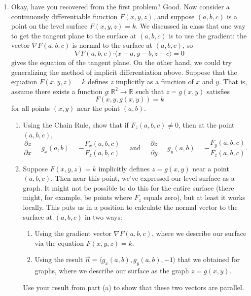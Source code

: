 \documentclass[letterpaper,12pt]{article}
\newcommand{\R}{\mathbb{R}}
\newcommand{\dotp}{\boldsymbol{\cdot}}
\begin{document}
\begin{enumerate}
\item Okay, have you recovered from the first problem? Good. Now consider a continuously differentiable function $F(x,y,z)$, and suppose $(a,b,c)$ is a point on the level surface $F(x,y,z)=k$. We discussed in class that one way to get the tangent plane to the surface at $(a,b,c)$ is to use the gradient: the vector $\nabla F(a,b,c)$ is normal to the surface at $(a,b,c)$, so
\[
 \nabla F(a,b,c) \dotp \langle x-a, y-b, z-c\rangle = 0
\]
gives the equation of the tangent plane. On the other hand, we could try generalizing the method of implicit differentiation above. Suppose that the equation $F(x,y,z)=k$ defines $z$ implicitly as a function of $x$ and $y$. That is, assume there exists a function $g:\R^2\to \R$ such that $z=g(x,y)$ satisfies
\[
 F(x,y,g(x,y))=k
\]
for all points $(x,y)$ near the point $(a,b)$.
\begin{enumerate}
 \item Using the Chain Rule, show that if $F_z(a,b,c)\neq 0$, then at the point $(a,b,c)$,
\[
 \frac{\partial z}{\partial x} = g_x(a,b) = -\frac{F_x(a,b,c)}{F_z(a,b,c)} \quad \text{ and } \quad \frac{\partial z}{\partial y} = g_y(a,b) = -\frac{F_y(a,b,c)}{F_z(a,b,c)}.
\]
 \item Suppose $F(x,y,z)=k$ implicitly defines $z=g(x,y)$ near a point $(a,b,c)$. Then near this point, we've expressed our level surface as a graph. It might not be possible to do this for the entire surface (there might, for example, be points where $F_z$ equals zero), but at least it works locally. This puts us in a position to calculate the normal vector to the surface at $(a,b,c)$ in two ways:
\begin{enumerate}
 \item Using the gradient vector $\nabla F(a,b,c)$, where we describe our surface via the equation $F(x,y,z)=k$.
 \item Using the result $\vec{n} = \langle g_x(a,b), g_y(a,b), -1\rangle$ that we obtained for graphs, where we describe our surface as the graph $z=g(x,y)$.
\end{enumerate}
Use your result from part (a) to show that these two vectors are parallel.
\end{enumerate}

\end{enumerate}
\end{document}
